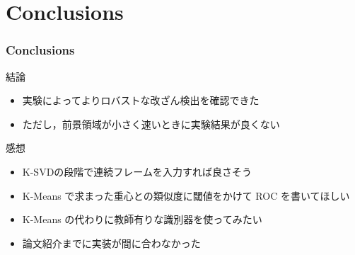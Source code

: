\section{Conclusions}


\begin{frame}\frametitle{Conclusions}
\begin{block}{結論}
\begin{itemize}
    \item 実験によってよりロバストな改ざん検出を確認できた
    \item ただし，前景領域が小さく速いときに実験結果が良くない
\end{itemize} 
\end{block}

\begin{block}{感想}
\begin{itemize}
  \item K-SVDの段階で連続フレームを入力すれば良さそう
  \item K-Means で求まった重心との類似度に閾値をかけて ROC を書いてほしい
  \item K-Means の代わりに教師有りな識別器を使ってみたい
  \item 論文紹介までに実装が間に合わなかった
\end{itemize}
\end{block}
\end{frame}